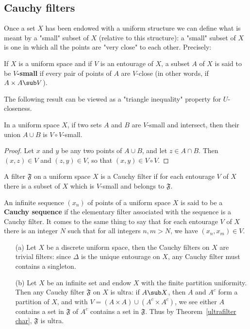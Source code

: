 \subsection{Cauchy filters}
Once a set $X$ has been endowed with a uniform structure we can define what is meant by a "small" subset of $X$ (relative to this structure): a "small" subset of $X$ is one in which all the points are "very close" to each other. Precisely:
\begin{definition}
If $X$ is a uniform space and if $V$ is an entourage of $X$, a subset $A$ of $X$ is said to be \textbf{$V$-small} if every pair of points of $A$ are $V$-close (in other words, if $A\times A\sub V$).
\end{definition}
The following result can be viewed as a "triangle inequality" property for $U$-closeness.
\begin{proposition}\label{uniform space union smallness}
In a uniform space $X$, if two sets $A$ and $B$ are $V$-small and intersect, then their union $A\cup B$ is $V\circ V$-small.
\end{proposition}
\begin{proof}
Let $x$ and $y$ be any two points of $A\cup B$, and let $z\in A\cap B$. Then $(x,z)\in V$ and $(z,y)\in V$, so that $(x,y)\in V\circ V$.
\end{proof}
A filter $\mathfrak{F}$ on a uniform space $X$ is a Cauchy filter if for each entourage $V$ of $X$ there is a subset of $X$ which is $V$-small and belongs to $\mathfrak{F}$.
\begin{remark}
An infinite sequence $(x_n)$ of points of a uniform space $X$ is said to be a \textbf{Cauchy sequence} if the elementary filter associated with the sequence is a Cauchy filter. It comes to the same thing to say that for each entourage $V$ of $X$ there is an integer $N$ such that for all integers $n,m>N$, we have $(x_n,x_m)\in V$.
\end{remark}
\begin{example}
\mbox{}
\begin{itemize}
\item[(a)] Let $X$ be a discrete uniform space, then the Cauchy filters on $X$ are trivial filters: since $\Delta$ is the unique entourage on $X$, any Cauchy filter must contains a singleton.
\item[(b)] Let $X$ be an infinite set and endow $X$ with the finite partition uniformity. Then any Cauchy filter $\mathfrak{F}$ on $X$ is ultra: if $A\sub X$, then $A$ and $A^c$ form a partition of $X$, and with $V=(A\times A)\cup(A^c\times A^c)$, we see either $A$ contains a set in $\mathfrak{F}$ of $A^c$ contains a set in $\mathfrak{F}$. Thus by Theorem~\ref{ultrafilter char}, $\mathfrak{F}$ is ultra.
\end{itemize}
\end{example}

